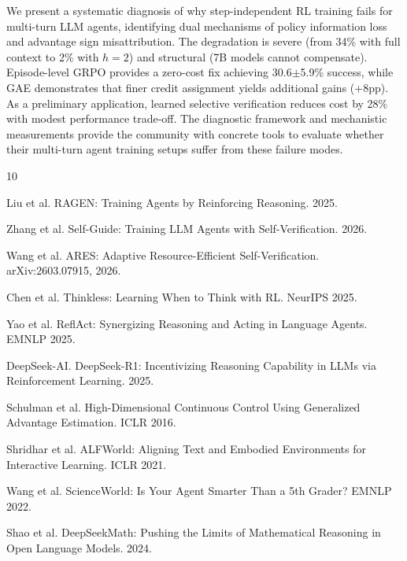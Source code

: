 \documentclass[11pt]{article}
\begin{document}
We present a systematic diagnosis of why step-independent RL training fails for multi-turn LLM agents, identifying dual mechanisms of policy information loss and advantage sign misattribution. The degradation is severe (from 34\% with full context to 2\% with $h=2$) and structural (7B models cannot compensate). Episode-level GRPO provides a zero-cost fix achieving 30.6$\pm$5.9\% success, while GAE demonstrates that finer credit assignment yields additional gains (+8pp). As a preliminary application, learned selective verification reduces cost by 28\% with modest performance trade-off. The diagnostic framework and mechanistic measurements provide the community with concrete tools to evaluate whether their multi-turn agent training setups suffer from these failure modes.


\begin{thebibliography}{10}

 Liu et al. RAGEN: Training Agents by Reinforcing Reasoning. 2025.

 Zhang et al. Self-Guide: Training LLM Agents with Self-Verification. 2026.

 Wang et al. ARES: Adaptive Resource-Efficient Self-Verification. arXiv:2603.07915, 2026.

 Chen et al. Thinkless: Learning When to Think with RL. NeurIPS 2025.

 Yao et al. ReflAct: Synergizing Reasoning and Acting in Language Agents. EMNLP 2025.

 DeepSeek-AI. DeepSeek-R1: Incentivizing Reasoning Capability in LLMs via Reinforcement Learning. 2025.

 Schulman et al. High-Dimensional Continuous Control Using Generalized Advantage Estimation. ICLR 2016.

 Shridhar et al. ALFWorld: Aligning Text and Embodied Environments for Interactive Learning. ICLR 2021.

 Wang et al. ScienceWorld: Is Your Agent Smarter Than a 5th Grader? EMNLP 2022.

 Shao et al. DeepSeekMath: Pushing the Limits of Mathematical Reasoning in Open Language Models. 2024.

\end{thebibliography}
\end{document}

